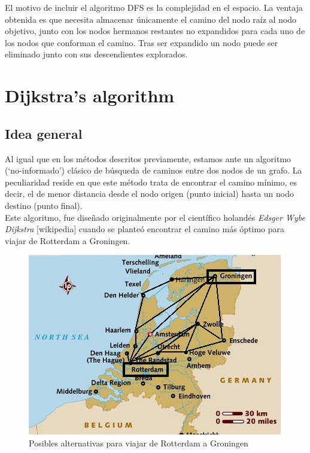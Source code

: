 \documentclass[conference]{IEEEtran}
\begin{document}
{{\begin{itemize}
El motivo de incluir el algoritmo DFS es la complejidad en el espacio. La ventaja obtenida es que necesita almacenar \'unicamente el camino del nodo ra\'iz al nodo objetivo, junto con los nodos hermanos restantes no expandidos para cada uno de los nodos que conforman el camino. Tras ser expandido un nodo puede ser eliminado junto con sus descendientes explorados.

\end{itemize}
}



\section{Dijkstra's algorithm}

\vspace{0.2mm}

\subsection{Idea general}

Al igual que en los métodos descritos previamente, estamos ante un algoritmo (`no-informado') clásico de búsqueda de caminos entre dos nodos de un grafo. La peculiaridad reside en que este método trata de encontrar el camino mínimo, es decir, el de menor distancia desde el nodo origen (punto inicial) hasta un nodo destino (punto final).\\

Este algoritmo, fue diseñado originalmente por el científico holandés \textit{Edsger Wybe Dijkstra} [wikipedia] cuando se planteó encontrar el camino más óptimo para viajar de Rotterdam a Groningen.

\begin{figure}[H]
\centerline{\includegraphics[scale=0.55]{IMAGENES/rotterdam.png}}
\caption{Posibles alternativas para viajar de Rotterdam a Groningen}
\label{fig}
\end{figure}

}
\end{document}
